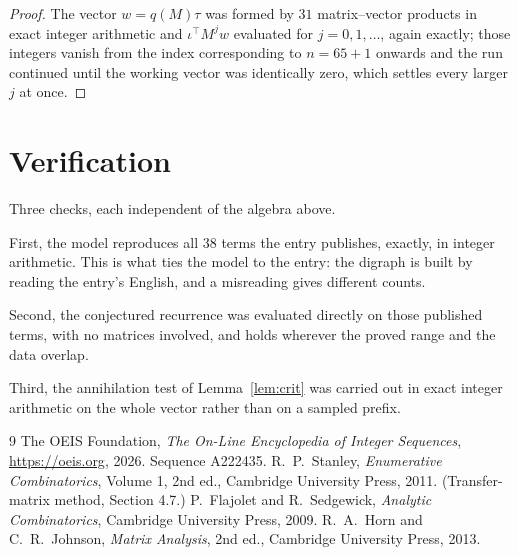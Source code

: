\documentclass[11pt,a4paper]{article}
\theoremstyle{plain}
\theoremstyle{definition}
\begin{document}
\begin{proof}
The vector $w=q(M)\tau$ was formed by $31$ matrix--vector products in exact integer
arithmetic and $\iota^{\!\top}M^{j}w$ evaluated for $j=0,1,\dots$, again exactly; those
integers vanish from the index corresponding to $n=65+1$ onwards and the run continued
until the working vector was identically zero, which settles every larger $j$ at once.
\end{proof}

\section{Verification}

Three checks, each independent of the algebra above.

First, the model reproduces all $38$ terms the entry publishes, exactly, in integer
arithmetic. This is what ties the model to the entry: the digraph is built by reading the
entry's English, and a misreading gives different counts.

Second, the conjectured recurrence was evaluated directly on those published terms, with no
matrices involved, and holds wherever the proved range and the data overlap.

Third, the annihilation test of Lemma~\ref{lem:crit} was carried out in exact integer
arithmetic on the whole vector rather than on a sampled prefix.

\begin{thebibliography}{9}
 The OEIS Foundation, \emph{The On-Line Encyclopedia of Integer
Sequences}, \url{https://oeis.org}, 2026. Sequence A222435.
 R.~P.~Stanley, \emph{Enumerative Combinatorics}, Volume 1, 2nd ed.,
Cambridge University Press, 2011. (Transfer-matrix method, Section 4.7.)
 P.~Flajolet and R.~Sedgewick, \emph{Analytic Combinatorics}, Cambridge
University Press, 2009.
 R.~A.~Horn and C.~R.~Johnson, \emph{Matrix Analysis}, 2nd ed., Cambridge
University Press, 2013.
\end{thebibliography}
\end{document}
